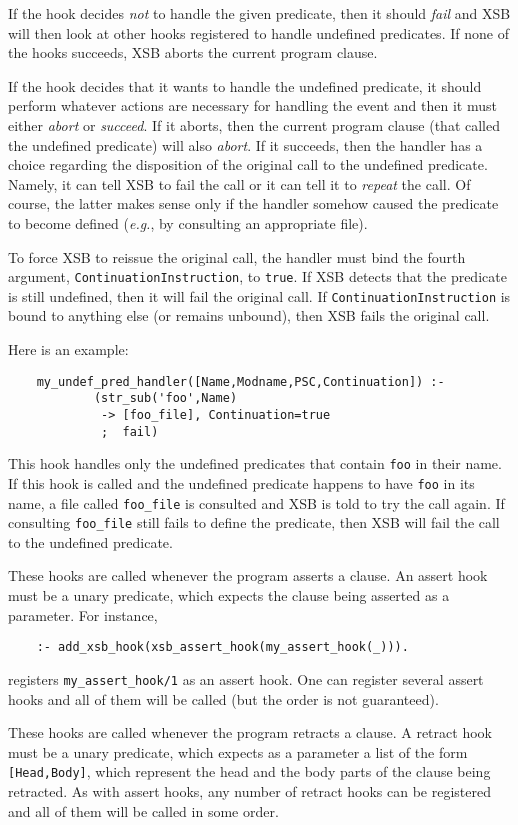\begin{description}
If the hook decides \emph{not} to handle the given
predicate, then it should \emph{fail} and XSB will then look at other hooks
registered to handle undefined predicates. If none of the hooks succeeds,
XSB aborts the current program clause.

If the hook decides that it wants to handle the undefined predicate, it
should perform whatever actions are necessary for handling the event and
then it must either \emph{abort} or \emph{succeed}.  If it aborts, then the
current program clause (that called the undefined predicate) will also
\emph{abort}.  If it succeeds, then the handler has a choice regarding the
disposition of the original call to the undefined predicate. Namely, it can
tell XSB to fail the call or it can tell it to \emph{repeat} the call. Of
course, the latter makes sense only if the handler somehow caused the
predicate to become defined ({\it e.g.}, by consulting an appropriate
file).

To force XSB to reissue the original call, the handler must bind the fourth
argument, {\tt ContinuationInstruction}, to {\tt true}. If XSB detects that
the predicate is still undefined, then it will fail the original call.  If
{\tt ContinuationInstruction} is bound to anything else (or remains
unbound), then XSB fails the original call.

Here is an example:
\begin{verbatim}
    my_undef_pred_handler([Name,Modname,PSC,Continuation]) :-
            (str_sub('foo',Name)
             -> [foo_file], Continuation=true
             ;  fail)
\end{verbatim}
This hook handles only the undefined predicates that contain {\tt foo} in
their name.  If this hook is called and the undefined predicate happens to
have {\tt foo} in its name, a file called {\tt foo\_file} is consulted and
XSB is told to try the call again. If consulting {\tt foo\_file} still
fails to define the predicate, then XSB will fail the call to the undefined
predicate.


 

These hooks are called whenever the program asserts a clause. An assert
hook must be a unary predicate, which expects the clause
being asserted as a parameter. For instance,
\begin{verbatim}
    :- add_xsb_hook(xsb_assert_hook(my_assert_hook(_))).
\end{verbatim}
registers {\tt my\_assert\_hook/1} as an assert hook. One can register
several assert hooks and all of them will be called (but the order is not
guaranteed).

 

These hooks are called whenever the program retracts a clause. A retract
hook must be a unary predicate, which expects as a parameter a list of the
form {\tt [Head,Body]}, which represent the head and the body parts of the
clause being retracted. As with assert hooks, any number of retract hooks
can be registered and all of them will be called in some order.

\end{description}


